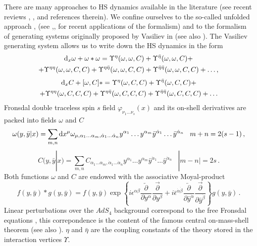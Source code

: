 \documentclass[12pt]{article}
\newcommand{\dr}{{{\rm d}}}
\newcommand{\go}{\omega}
\begin{document}
There are many approaches to HS dynamics available in the literature (see recent reviews \cite{Bekaert:2004qos}, \cite{Didenko:2014dwa}, \cite{Ponomarev:2022vjb} and references therein). We confine ourselves to the so-called unfolded approach \cite{Vasiliev:1988xc}, \cite{Vasiliev:1988sa} (see \cite{Misuna:2026bhy},\cite{Zinoviev:2026osh},\cite{Iazeolla:2025btr} for recent applications of the formalism) and to the formalism of generating systems originally proposed by Vasiliev in \cite{Vasiliev:1990en} (see also \cite{Vasiliev:1992av}). The Vasiliev generating system allows us to write down the HS dynamics in the form
\begin{multline}\label{sch1form}
\dr_x \go+\go\ast \go=\Upsilon^\eta(\go,\go,C)+\Upsilon^{\bar{\eta}}(\go,\go,C)+\\
+\Upsilon^{\eta\eta}(\go,\go,C,C)+\Upsilon^{\eta\bar{\eta}}(\go,\go,C,C)+\Upsilon^{\bar{\eta}\bar{\eta}}(\go,\go,C,C)+\ldots ,
\end{multline}
\begin{multline}\label{sch0form}
\dr_x C+[\go,C]\ast=\Upsilon^\eta(\go,C,C)+\Upsilon^{\bar{\eta}}(\go,C,C)+\\+\Upsilon^{\eta\eta}(\go,C,C,C)+\Upsilon^{\eta\bar{\eta}}(\go,C,C,C)+\Upsilon^{\bar{\eta}\bar{\eta}}(\go,C,C,C)+\ldots
\end{multline}
Fronsdal double traceless spin $s$ field  $\varphi_{\nu_1\ldots \nu_s}(x)$
and its on-shell derivatives are packed into fields $\go$ and $C$
\begin{equation}
\go(y,\bar{y}|x)=\sum_{m,n}\dr x^\mu \omega_{\mu, \alpha_1 \ldots \alpha_m,\dot{\alpha}_1 \ldots \dot{\alpha}_n} y^{\alpha_1}\ldots y^{\alpha_m}\bar{y}^{\dot{\alpha}_1}\ldots \bar{y}^{\dot{\alpha}_n}\;\;\; m+n=2(s-1)\,,
\end{equation}
\begin{equation}
C(y,\bar{y}|x)=\sum_{m,n}C_{\alpha_1 \ldots \alpha_m,\dot{\alpha}_1\ldots \dot{\alpha}_n} y^{\alpha_1}\ldots y^{\alpha_m}\bar{y}^{\dot{\alpha}_1}\ldots \bar{y}^{\dot{\alpha}_n}\;\;\; |m-n|=2s\,.
\end{equation}
Both functions $\go$ and $C$ are endowed with the associative Moyal-product
\begin{equation}\label{Moyal}
f(y,\bar{y})\ast g(y,\bar{y})=f(y,\bar{y})\exp\left\{i\epsilon^{\alpha \beta} \frac{\overleftarrow{\partial}}{\partial y^\alpha}\frac{\overrightarrow{\partial}}{\partial y^\beta}+i\bar{\epsilon}^{\dot{\alpha}\dot{\beta}}\frac{\overleftarrow{\partial}}{\partial \bar{y}^{\dot{\alpha}}}\frac{\overrightarrow{\partial}}{\partial \bar{y}^{\dot{\beta}}}\right\}g(y,\bar{y})\,.
\end{equation}
Linear perturbations over the $AdS_4$ background correspond to the free Fronsdal equations \cite{Fronsdal:1978rb}, this correpondence is the content of the famous central on-mass-shell theorem \cite{Vasiliev:1999ba} (see also \cite{Bychkov:2021zvd}). $\eta$ and $\bar{\eta}$ are the coupling constants of the theory stored in the interaction vertices $\Upsilon$.
\end{document}
